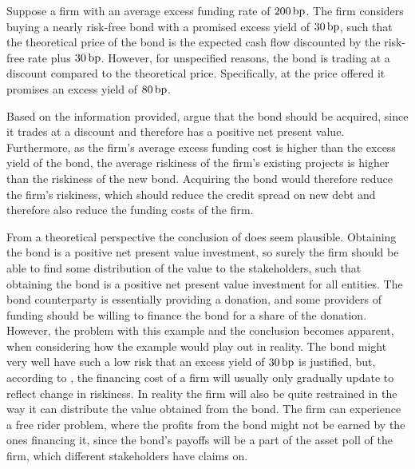 \documentclass[main.tex]{subfiles}
\begin{document}
            \begin{example}
            Suppose a firm with an average excess funding rate of $200\,\text{bp}$. 
            The firm considers buying a nearly risk-free bond with a promised excess yield of $30\,\text{bp}$,
            such that the theoretical price of the bond is the expected cash flow 
            discounted by the risk-free rate plus $30\,\text{bp}$.
            However, for unspecified reasons, the bond is trading at a discount compared to the theoretical price.
            Specifically, at the price offered it promises an excess yield of $80\,\text{bp}$.
            
            Based on the information provided, \textcite{HullWhite2012FVA} argue that the bond should be acquired,
            since it trades at a discount and therefore has a positive net present value.
            Furthermore, as the firm's average excess funding cost is higher than the excess yield of the bond, 
            the average riskiness of the firm's existing projects is higher than the riskiness of the new bond.
            Acquiring the bond would therefore reduce the firm's riskiness,
            which should reduce the credit spread on new debt and therefore also reduce the funding costs of the firm.
            \end{example}
            
            From a theoretical perspective the conclusion of \textcite{HullWhite2012FVA} does seem plausible. 
            Obtaining the bond is a positive net present value investment, 
            so surely the firm should be able to find some distribution of the value to the stakeholders, 
            such that obtaining the bond is a positive net present value investment for all entities.
            The bond counterparty is essentially providing a donation, 
            and some providers of funding should be willing to finance the bond for a share of the donation.
            However, the problem with this example and the conclusion becomes apparent,
            when considering how the example would play out in reality. 
            The bond might very well have such a low risk that an excess yield of $30\,\text{bp}$ is justified, 
            but, according to \textcite[Section 3]{Castagna2012FVA}, 
            the financing cost of a firm will usually only gradually update to reflect change in riskiness.
            In reality the firm will also be quite restrained 
            in the way it can distribute the value obtained from the bond.
            The firm can experience a free rider problem, 
            where the profits from the bond might not be earned by the ones financing it,
            since the bond's payoffs will be a part of the asset poll of the firm,
            which different stakeholders have claims on.
\end{document}
